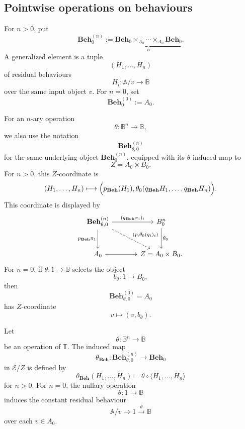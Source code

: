 \subsection{Pointwise operations on behaviours}
\label{subsec:pointwise-operations-behaviours}

For \(n>0\), put
\[
    \mathbf{Beh}_0^{(n)}
    :=
    \underbrace{
    \mathbf{Beh}_0\times_{A_0}\cdots\times_{A_0}\mathbf{Beh}_0
    }_{n}.
\]
A generalized element is a tuple
\[
    (H_1,\dots,H_n)
\]
of residual behaviours
\[
    H_i:\mathbb A/v\to\mathbb B
\]
over the same input object \(v\). For \(n=0\), set
\[
    \mathbf{Beh}_0^{(0)}:=A_0.
\]

For an \(n\)-ary operation
\[
    \theta:\mathbb B^n\to\mathbb B,
\]
we also use the notation
\[
    \mathbf{Beh}^{(n)}_{\theta,0}
\]
for the same underlying object \(\mathbf{Beh}_0^{(n)}\), equipped with its
\(\theta\)-induced map to
\[
    Z=A_0\times B_0.
\]
For \(n>0\), this \(Z\)-coordinate is
\[
    (H_1,\dots,H_n)
    \longmapsto
    \Bigl(
        p_{\mathbf{Beh}}(H_1),
        \theta_0(q_{\mathbf{Beh}}H_1,\dots,q_{\mathbf{Beh}}H_n)
    \Bigr).
\]
This coordinate is displayed by
\[
\begin{tikzcd}[column sep=large, row sep=large]
    \mathbf{Beh}^{(n)}_{\theta,0}
        \arrow[r, "{(q_{\mathbf{Beh}}\pi_i)_i}"]
        \arrow[d, "{p_{\mathbf{Beh}}\pi_1}"']
        \arrow[dr, dashed, "{(p,\theta_0(q_i)_i)}"]
    &
    B_0^n
        \arrow[d, "\theta_0"]
    \\
    A_0
        \arrow[r]
    &
    Z=A_0\times B_0 .
\end{tikzcd}
\]
For \(n=0\), if \(\theta:1\to\mathbb B\) selects the object
\[
    b_\theta:1\to B_0,
\]
then
\[
    \mathbf{Beh}^{(0)}_{\theta,0}=A_0
\]
has \(Z\)-coordinate
\[
    v\longmapsto(v,b_\theta).
\]

\begin{definition}
\label{def:pointwise-structured-behaviour}
    Let
    \[
        \theta:\mathbb B^n\to\mathbb B
    \]
    be an operation of \(\mathbb T\). The induced map
    \[
        \theta_{\mathbf{Beh}}:
        \mathbf{Beh}^{(n)}_{\theta,0}\to\mathbf{Beh}_0
    \]
    in \(\mathcal E/Z\) is defined by
    \[
        \theta_{\mathbf{Beh}}(H_1,\dots,H_n)
        =
        \theta\circ\langle H_1,\dots,H_n\rangle
    \]
    for \(n>0\). For \(n=0\), the nullary operation
    \[
        \theta:1\to\mathbb B
    \]
    induces the constant residual behaviour
    \[
        \mathbb A/v\to 1\xrightarrow{\theta}\mathbb B
    \]
    over each \(v\in A_0\).
\end{definition}

